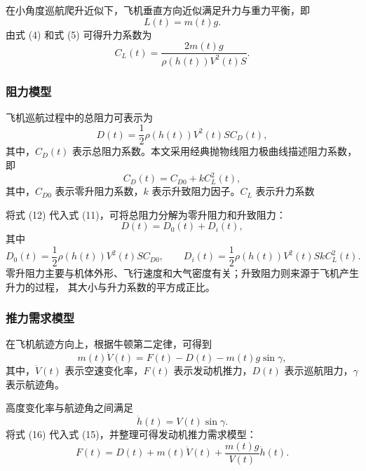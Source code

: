 \documentclass[withoutpreface,bwprint]{cumcmthesis} %
\begin{document}
在小角度巡航爬升近似下，飞机垂直方向近似满足升力与重力平衡，即
\begin{equation}
    L(t)=m(t)g.
    \label{eq:lift_balance}
\end{equation}
由式 (4) 和式 (5) 可得升力系数为
\begin{equation}
    C_L(t)=\frac{2m(t)g}{\rho(h(t))V^2(t)S}.
    \label{eq:CL}
\end{equation}
\subsubsection{阻力模型}

飞机巡航过程中的总阻力可表示为\cite{6}
\begin{equation}
    D(t)=\frac{1}{2}\rho(h(t))V^2(t)S C_D(t),
    \label{eq:drag}
\end{equation}
其中，$C_D(t)$ 表示总阻力系数。本文采用经典抛物线阻力极曲线描述阻力系数\cite{3}，
即
\begin{equation}
    C_D(t)=C_{D0}+kC_L^2(t),
    \label{eq:CD}
\end{equation}
其中，$C_{D0}$ 表示零升阻力系数，$k$ 表示升致阻力因子。$C_{L}$ 表示升力系数

将式 (12) 代入式 (11)，可将总阻力分解为零升阻力和升致阻力：
\begin{equation}
    D(t)=D_0(t)+D_i(t),
    \label{eq:D_decompose}
\end{equation}
其中
\begin{equation}
    D_0(t)=\frac{1}{2}\rho(h(t))V^2(t)S C_{D0},
    \qquad
    D_i(t)=\frac{1}{2}\rho(h(t))V^2(t)S kC_L^2(t).
    \label{eq:D0_Di}
\end{equation}
零升阻力主要与机体外形、飞行速度和大气密度有关；升致阻力则来源于飞机产生升力的过程，
其大小与升力系数的平方成正比。\cite{7}

\subsubsection{推力需求模型}
在飞机航迹方向上，根据牛顿第二定律，可得到
\begin{equation}
    m(t)\dot V(t)
    =
    F(t)-D(t)-m(t)g\sin\gamma,
    \label{eq:force_balance}
\end{equation}
其中，$\dot V(t)$ 表示空速变化率，$F(t)$ 表示发动机推力，$D(t)$ 表示巡航阻力，$\gamma$ 表示航迹角。

高度变化率与航迹角之间满足
\begin{equation}
    \dot h(t)=V(t)\sin\gamma.
    \label{eq:h_dot}
\end{equation}
将式 (16) 代入式 (15)，并整理可得发动机推力需求模型：
\begin{equation}
    F(t)=D(t)+m(t)\dot V(t)
    +\frac{m(t)g}{V(t)}\dot h(t).
    \label{eq:thrust}
\end{equation}
\end{document}
